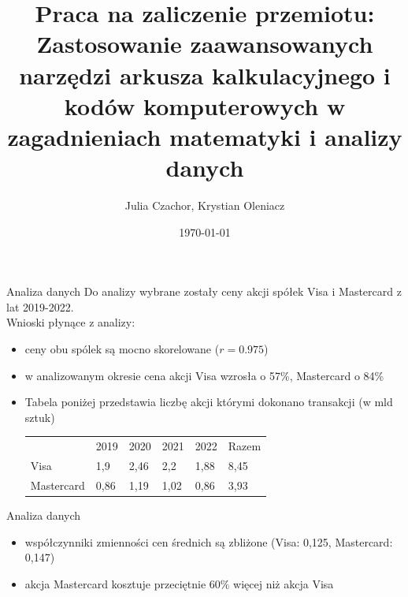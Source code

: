 \documentclass{beamer}
\title{Praca na zaliczenie przemiotu: Zastosowanie zaawansowanych narzędzi arkusza kalkulacyjnego i kodów komputerowych w zagadnieniach matematyki i analizy danych}
\date{\today}
\author{Julia Czachor, Krystian Oleniacz}
\begin{document}
  \maketitle
  \begin{frame}{Analiza danych}
    Do analizy wybrane zostały ceny akcji spółek Visa i Mastercard z lat 2019-2022. \\
    Wnioski płynące z analizy:
    \begin{itemize}
      \item ceny obu spólek są mocno skorelowane ($r  = 0.975$)
      \item w analizowanym okresie cena akcji Visa wzrosła o 57\%, Mastercard o 84\%
      \item Tabela poniżej przedstawia liczbę akcji którymi dokonano transakcji (w mld sztuk)
      \begin{table}[]
        \begin{tabular}{llllll}
                   & 2019 & 2020 & 2021 & 2022 & Razem \\
        Visa       & 1,9  & 2,46 & 2,2  & 1,88 & 8,45  \\
        Mastercard & 0,86 & 1,19 & 1,02 & 0,86 & 3,93 
        \end{tabular}
        \end{table}
    \end{itemize}
  \end{frame}

\begin{frame}{Analiza danych}
  \begin{itemize}
    \item współczynniki zmienności cen średnich są zbliżone (Visa:  0,125, Mastercard: 0,147)
    \item akcja Mastercard kosztuje przeciętnie 60\% więcej niż akcja Visa
  \end{itemize}
\end{frame}
\end{document}
